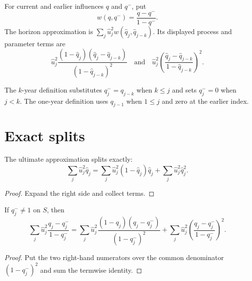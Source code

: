 \begin{definition}\label{def:rohrHorizon}\leanok
For current and earlier influences $q$ and $q^-$, put
\[
  w(q,q^-)=\frac{q-q^-}{1-q^-}.
\]
The horizon approximation is $\sum_j\hat u_j^2w(\hat q_j,\hat q_{j-k})$.
Its displayed process and parameter terms are
\[
 \hat u_j^2\frac{(1-\hat q_j)(\hat q_j-\hat q_{j-k})}
 {(1-\hat q_{j-k})^2}
 \quad\text{and}\quad
 \hat u_j^2\left(\frac{\hat q_j-\hat q_{j-k}}
 {1-\hat q_{j-k}}\right)^2.
\]
\end{definition}

\begin{definition}\label{def:rohrKYear}\leanok
The $k$-year definition substitutes $q^-_j=q_{j-k}$ when $k\le j$ and sets
$q^-_j=0$ when $j<k$. The one-year definition uses $q_{j-1}$ when $1\le j$
and zero at the earlier index.
\end{definition}

\section{Exact splits}

\begin{theorem}\label{thm:rohrHorizonUltimateSplit}\leanok
The ultimate approximation splits exactly:
\[
 \sum_j\hat u_j^2\hat q_j
 =\sum_j\hat u_j^2(1-\hat q_j)\hat q_j
  +\sum_j\hat u_j^2\hat q_j^2.
\]
\end{theorem}
\begin{proof}\leanok Expand the right side and collect terms. \end{proof}

\begin{theorem}\label{thm:rohrHorizonSplit}\leanok
If $q^-_j\ne 1$ on $S$, then
\[
 \sum_j\hat u_j^2\frac{q_j-q^-_j}{1-q^-_j}
 =\sum_j\hat u_j^2\frac{(1-q_j)(q_j-q^-_j)}{(1-q^-_j)^2}
  +\sum_j\hat u_j^2\left(\frac{q_j-q^-_j}{1-q^-_j}\right)^2.
\]
\end{theorem}
\begin{proof}\leanok Put the two right-hand numerators over the common denominator
$(1-q^-_j)^2$ and sum the termwise identity. \end{proof}

